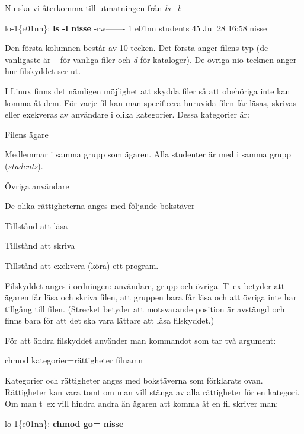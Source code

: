 \documentclass[a4paper,twocolumn]{book}
\begin{document}
\label{sec:filskydd}
Nu ska vi återkomma till utmatningen från \emph{ls~-l}:
\begin{example}
\scriptsize
lo-1\{e01nn\}: \textbf{ls -l nisse}
-rw-------   1 e01nn  students  45  Jul 28 16:58 nisse
\end{example}
Den första kolumnen består av 10 tecken. Det första anger filens typ
(de vanligaste är -- för vanliga filer och \emph{d} för kataloger). De
övriga nio tecknen anger hur filskyddet ser ut.

I Linux finns det nämligen möjlighet att skydda filer så att
obehöriga inte kan komma åt dem. För varje fil kan man specificera
huruvida filen får läsas, skrivas eller exekveras av användare i olika
kategorier. Dessa kategorier är:
\begin{description}
\samepage
\item[u (user)] Filens ägare
\item[g (group)] Medlemmar i samma grupp som ägaren. Alla studenter
  är med i samma grupp (\emph{students}).
\item[o (others)] Övriga användare
\end{description}
De olika rättigheterna anges med följande bokstäver
\begin{description}
\samepage
\item[r (read)] Tillstånd att läsa
\item[w (write)] Tillstånd att skriva 
\item[x (execute)] Tillstånd att exekvera (köra) ett program.
\end{description}

Filskyddet anges i ordningen: användare, grupp och övriga. T~ex
betyder  att ägaren får läsa och skriva filen, att
gruppen bara får läsa och att övriga inte har tillgång till filen.
(Strecket betyder att motsvarande position är avstängd och finns bara
för att det ska vara lättare att läsa filskyddet.)

För att ändra filskyddet använder man kommandot  som
tar två argument:
\begin{ttquote}
  chmod kategorier=rättigheter filnamn
\end{ttquote}
Kategorier och rättigheter anges med bokstäverna som förklarats
ovan. Rättigheter kan vara tomt om man vill stänga av alla rättigheter
för en kategori. Om man t~ex vill hindra andra än ägaren att komma åt
en fil skriver man:
\begin{example}
lo-1\{e01nn\}: \textbf{chmod go= nisse}
\end{example}
\end{document}
